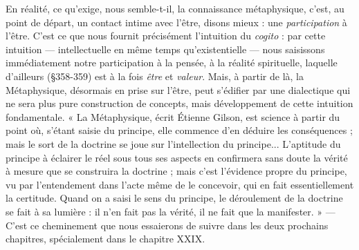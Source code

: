 En réalité, ce qu’exige, nous semble-t-il, la connaissance métaphysique,
c’est, au point de départ, un contact intime avec l'être, disons
mieux : une {\it participation} à l'être. C’est ce que nous fournit précisément
l'intuition du {\it cogito} : par cette intuition — intellectuelle en
même temps qu’existentielle — nous saisissons immédiatement notre
participation à la pensée, à la réalité spirituelle, laquelle d’ailleurs
(\S 358-359) est à la fois {\it être} et {\it valeur}. Mais, à partir de là, la Métaphysique,
désormais en prise sur l’être, peut s’édifier par une dialectique
qui ne sera plus pure construction de concepts, mais développement
de cette intuition fondamentale. « La Métaphysique, écrit Étienne
Gilson, est science à partir du point où, s’étant saisie du principe,
elle commence d’en déduire les conséquences ; mais le sort de la
doctrine se joue sur l’intellection du principe... L’aptitude du principe
à éclairer le réel sous tous ses aspects en confirmera sans doute la
vérité à mesure que se construira la doctrine ; mais c’est l’évidence
propre du principe, vu par l’entendement dans l’acte même de le
concevoir, qui en fait essentiellement la certitude. Quand on a saisi le
sens du principe, le déroulement de la doctrine se fait à sa lumière :
il n’en fait pas la vérité, il ne fait que la manifester. » — C’est ce
cheminement que nous essaierons de suivre dans les deux prochains
chapitres, spécialement dans le chapitre XXIX.

